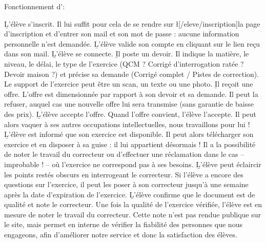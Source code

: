 ﻿Fonctionnement d'\eDevoir :
\begin{enumerate}
	\li \b{L'élève s'inscrit.} Il lui suffit pour cela de se rendre sur \l[/eleve/inscription]{la page d'inscription} et d'entrer son mail et son mot de passe : aucune information personnelle n'est demandée.
	\li \b{L'élève valide son compte en cliquant sur le lien reçu dans son mail.}
	\li \b{L'élève se connecte.}
	\li \b{Il poste un devoir.} Il indique la matière, le niveau, le délai, le type de l'exercice (QCM ? Corrigé d'interrogation ratée ? Devoir maison ?) et précise sa demande (Corrigé complet / Pistes de correction). Le support de l'exercice peut être un scan, un texte ou une photo.
	\li \b{Il reçoit une offre.} L'offre est dimensionnée par rapport à son devoir et sa demande. Il peut la refuser, auquel cas une nouvelle offre lui sera transmise (sans garantie de baisse des prix).
	\li \b{L'élève accepte l'offre.} Quand l'offre convient, l'élève l'accepte. Il peut alors vaquer à ses autres occupations intellectuelles, nous travaillons pour lui !
	\li \b{L'élève est informé que son exercice est disponible.} Il peut alors télécharger son exercice et en disposer à sa guise : il lui appartient désormais ! Il a la possibilité de noter le travail du correcteur ou d'effectuer une réclamation dans le cas -- improbable ! -- où l'exercice ne correspond pas à ses besoins.
	\li \b{L'élève peut éclaircir les points restés obscurs en interrogeant le correcteur.} Si l'élève a encore des questions sur l'exercice, il peut les poser à son correcteur jusqu'à une semaine après la date d'expiration de l'exercice.
	\li \b{L'élève confirme que le document est de qualité et note le correcteur.} Une fois la qualité de l'exercice vérifiée, l'élève est en mesure de noter le travail du correcteur. Cette note n'est pas rendue publique sur le site, mais permet en interne de vérifier la fiabilité des personnes que nous engageons, afin d'améliorer notre service et donc la satisfaction des élèves.
\end{enumerate}